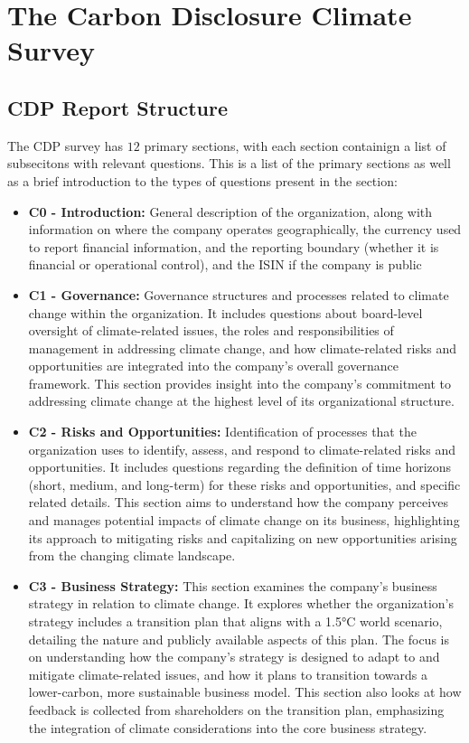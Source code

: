 \chapter{The Carbon Disclosure Climate Survey}

\section{CDP Report Structure}
The CDP survey has $12$ primary sections, with each section containign a list of subsecitons with relevant questions. This is a list of the primary sections as well as a brief introduction to the types of questions present in the section:
\begin{itemize}
    \item \textbf{C0 - Introduction:} General description of the organization, along with information on where the company operates geographically, the currency used to report financial information, and the reporting boundary (whether it is financial or operational control), and the ISIN if the company is public
    \item \textbf{C1 - Governance:} Governance structures and processes related to climate change within the organization. It includes questions about board-level oversight of climate-related issues, the roles and responsibilities of management in addressing climate change, and how climate-related risks and opportunities are integrated into the company's overall governance framework. This section provides insight into the company's commitment to addressing climate change at the highest level of its organizational structure.
    \item \textbf{C2 - Risks and Opportunities:} Identification of processes that the organization uses to identify, assess, and respond to climate-related risks and opportunities. It includes questions regarding the definition of time horizons (short, medium, and long-term) for these risks and opportunities, and specific related details. This section aims to understand how the company perceives and manages potential impacts of climate change on its business, highlighting its approach to mitigating risks and capitalizing on new opportunities arising from the changing climate landscape.
    \item \textbf{C3 - Business Strategy:} This section examines the company's business strategy in relation to climate change. It explores whether the organization's strategy includes a transition plan that aligns with a 1.5°C world scenario, detailing the nature and publicly available aspects of this plan. The focus is on understanding how the company's strategy is designed to adapt to and mitigate climate-related issues, and how it plans to transition towards a lower-carbon, more sustainable business model. This section also looks at how feedback is collected from shareholders on the transition plan, emphasizing the integration of climate considerations into the core business strategy.

\end{itemize}
